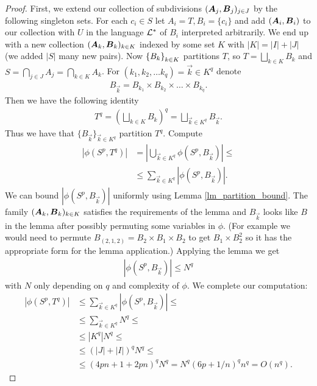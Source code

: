 \begin{proof}
  First, we extend our collection of subdivisions $(\operatorname{\boldsymbol A}_j, \operatorname{\boldsymbol B}_j)_{j \in J}$ by the following singleton sets.
  For each $c_i \in S$ let $A_i = T, B_i = \{c_i\}$ and add $(\operatorname{\boldsymbol A}_i, \operatorname{\boldsymbol B}_i)$ to our collection with $U$ in the language $\mathcal L^*$ of $B_i$ interpreted arbitrarily.
  We end up with a new collection $(\operatorname{\boldsymbol A}_k, \operatorname{\boldsymbol B}_k)_{k \in K}$ indexed by some set $K$ with $|K| = |I| + |J|$ (we added $|S|$ many new pairs). Now $\left\{B_k\right\}_{k \in K}$ partitions $T$, so $T = \bigsqcup_{k \in K} B_k$ and $S = \bigcap_{j \in J} A_j = \bigcap_{k \in K} A_k$. For $(k_1, k_2, \ldots k_q) = \vec k \in K^q$ denote 
  \begin{align*}
    B_{\vec k} = B_{k_1} \times B_{k_2} \times \ldots \times B_{k_q}.
  \end{align*}
  Then we have the following identity
  \begin{align*}
    T^q = (\bigsqcup_{k \in K} B_k)^q = \bigsqcup_{\vec k \in K^q} B_{\vec k}.
  \end{align*}
  Thus we have that $\{B_{\vec k}\}_{\vec k \in K^q}$ partition $T^q$. Compute
  \begin{align*}
    |\phi(S^p, T^q)|
    &= \left|\bigcup_{\vec k \in K^q} \phi(S^p, B_{\vec k}) \right| \leq \\
    &\leq \sum_{\vec k \in K^q} |\phi(S^p, B_{\vec k})|.
  \end{align*}
  We can bound $|\phi(S^p, B_{\vec k})|$ uniformly using Lemma \ref{lm_partition_bound}. The family $(\operatorname{\boldsymbol A}_k, \operatorname{\boldsymbol B}_k)_{k \in K}$ satisfies the requirements of the lemma and $B_{\vec k}$ looks like $B$ in the lemma after possibly permuting some variables in $\phi$.
  (For example we would need to permute $B_{(2,1,2)} = B_2 \times B_1 \times B_2$ to get $B_1 \times B_2^2$ so it has the appropriate form for the lemma application.)
  Applying the lemma we get
  \begin{align*}
    |\phi(S^p, B_{\vec k})| \leq N^q
  \end{align*}
  with $N$ only depending on $q$ and complexity of $\phi$. We complete our computation:
  \begin{align*}
    |\phi(S^p, T^q)|
    &\leq \sum_{\vec k \in K^q} |\phi(S^p, B_{\vec k})| \leq \\
    &\leq \sum_{\vec k \in K^q} N^q \leq \\
    &\leq |K^q| N^q \leq \\
    &\leq (|J| + |I|)^q N^q \leq \\
    &\leq (4pn + 1 + 2pn)^q N^q = N^q (6p + 1/n)^q n^q = O(n^q).
  \end{align*}
\end{proof}
